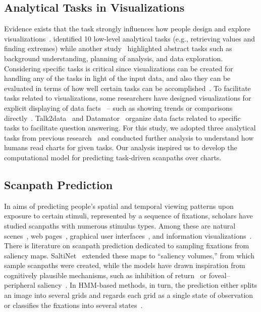 \subsection{Analytical Tasks in Visualizations}
Evidence exists that the task strongly influences how people design and explore visualizations~\cite{polatsek2018exploring, wu2020visact, shi2019task}.
\citet{amar2005low} identified 10 low-level analytical tasks (e.g., retrieving values and finding extremes) while another study~\cite{hibino1999task} highlighted abstract tasks such as background understanding, planning of analysis, and data exploration. 
Considering specific tasks is critical since visualizations can be created for handling any of the tasks in light of the input data, and also they can be evaluated in terms of how well certain tasks can be accomplished~\cite{schulz2013design}. 
To facilitate tasks related to visualizations, some researchers have designed visualizations for explicit displaying of data facts~\cite{srinivasan2018augmenting, shi2020calliope} -- such as showing trends or comparisons directly~\cite{shi2021autoclips, shi2024understanding}. 
Talk2data~\cite{guo2024talk2data} and Datamator~\cite{guo2023datamator} organize data facts related to specific tasks to facilitate question answering.
For this study, we adopted three analytical tasks from previous research~\cite{polatsek2018exploring} and conducted further analysis to understand how humans read charts for given tasks. 
Our analysis inspired us to develop the computational model for predicting task-driven scanpaths over charts.


\subsection{Scanpath Prediction}
In aims of predicting people's spatial and temporal viewing patterns upon exposure to certain stimuli, represented by a sequence of fixations, scholars have studied scanpaths with numerous stimulus types. Among these are natural scenes~\cite{coutrot2018scanpath, yang2020predicting}, web pages~\cite{drusch2014analysing}, graphical user interfaces~\cite{jokinen2020adaptive}, and information visualizations~\cite{wang2023scanpath}.
There is literature on scanpath prediction dedicated to sampling fixations from saliency maps\cite{brockmann2000ecology, boccignone2010gaze, kummerer2022deepgaze}. 
SaltiNet~\cite{assens2017saltinet} extended these maps to ``saliency volumes,'' from which sample scanpaths were created, while the models have drawn inspiration from cognitively plausible mechanisms, such as inhibition of return~\cite{itti1998model, sun2019visual} or foveal--peripheral saliency~\cite{wang2017scanpath, bao2020human}.
In HMM-based methods, in turn, the prediction either splits an image into several grids and regards each grid as a single state of observation~\cite{verma2019hmm} or classifies the fixations into several states~\cite{coutrot2018scanpath}.

